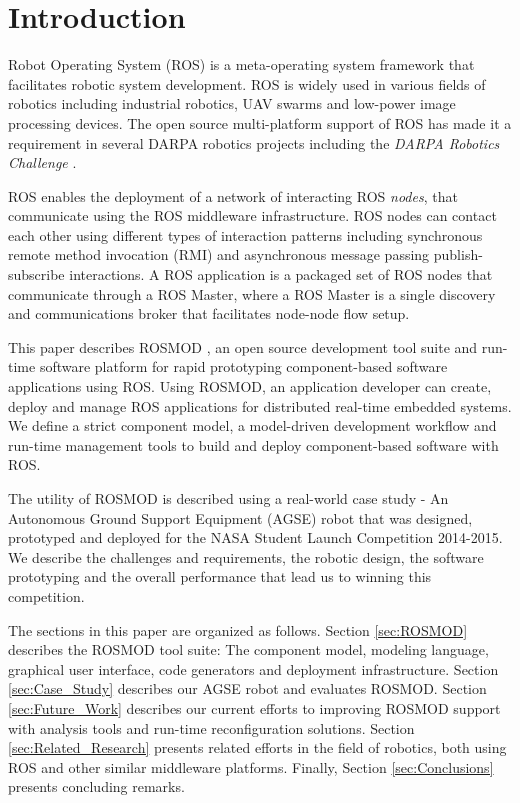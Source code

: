 \section{Introduction}

Robot Operating System (ROS) \cite{ROS} is a meta-operating system framework that facilitates robotic system development. ROS is widely used in various fields of robotics including industrial robotics, UAV swarms and low-power image processing devices. The open source multi-platform support of ROS has made it a requirement in several DARPA robotics projects including the \emph{DARPA Robotics Challenge} \cite{DARPA_Robotics_Challenge}.   

ROS enables the deployment of a network of interacting ROS \emph{nodes}, that communicate using the ROS middleware infrastructure. ROS nodes can contact each other using different types of interaction patterns including synchronous remote method invocation (RMI) and asynchronous message passing publish-subscribe interactions. A ROS application is a packaged set of ROS nodes that communicate through a ROS Master, where a ROS Master is a single discovery and communications broker that facilitates node-node flow setup.

This paper describes ROSMOD \cite{ROSMOD}, an open source development tool suite and run-time software platform for rapid prototyping component-based software applications using ROS. Using ROSMOD, an application developer can create, deploy and manage ROS applications for distributed real-time embedded systems. We define a strict component model, a model-driven development workflow and run-time management tools to build and deploy component-based software with ROS. 

The utility of ROSMOD is described using a real-world case study - An Autonomous Ground Support Equipment (AGSE) robot that was designed, prototyped and deployed for the NASA Student Launch Competition \cite{NASA_SL} 2014-2015. We describe the challenges and requirements, the robotic design, the software prototyping and the overall performance that lead us to winning this competition.

The sections in this paper are organized as follows. Section \ref{sec:ROSMOD} describes the ROSMOD tool suite: The component model, modeling language, graphical user interface, code generators and deployment infrastructure. Section \ref{sec:Case_Study} describes our AGSE robot and evaluates ROSMOD. Section \ref{sec:Future_Work} describes our current efforts to improving ROSMOD support with analysis tools and run-time reconfiguration solutions. Section \ref{sec:Related_Research} presents related efforts in the field of robotics, both using ROS and other similar middleware platforms. Finally, Section \ref{sec:Conclusions} presents concluding remarks.
